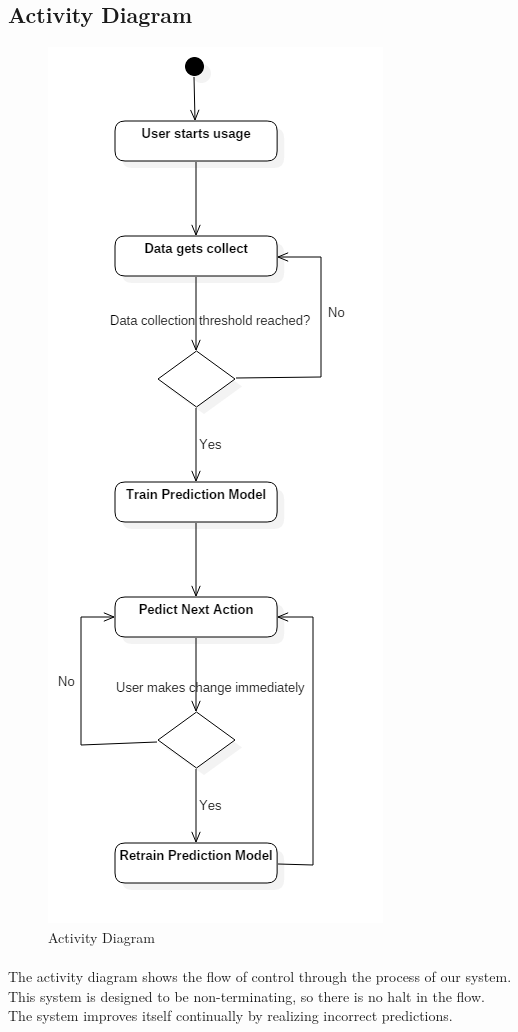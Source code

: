 	\subsection{Activity Diagram}
	\begin{figure}[H]
	\centering
	\includegraphics[scale=0.5]{./Chapter5/ActivityDiagram}
		\caption{Activity Diagram}
	\end{figure}
	\paragraph{}
	The activity diagram shows the flow of control through the process of our system. This system is designed to be non-terminating, so there is no halt in the flow. The system improves itself continually by realizing incorrect predictions.
	
